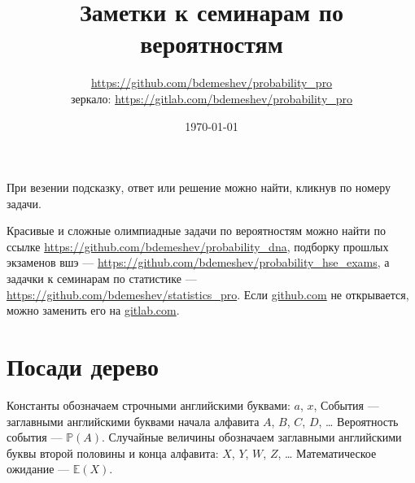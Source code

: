 \documentclass[12pt, a4paper]{article}
\title{Заметки к семинарам по вероятностям}
\author{\url{https://github.com/bdemeshev/probability_pro} \\
зеркало: \url{https://gitlab.com/bdemeshev/probability_pro}}
\date{\today}
\renewcommand{\P}{\mathbb{P}}
\newcommand{\E}{\mathbb{E}}
\begin{document}
\maketitle %


\newpage
\tableofcontents{}

\newpage

При везении подсказку, ответ или решение можно найти, кликнув по номеру задачи. 

Красивые и сложные олимпиадные задачи по вероятностям можно найти по ссылке \url{https://github.com/bdemeshev/probability_dna},
подборку прошлых экзаменов вшэ — \url{https://github.com/bdemeshev/probability_hse_exams},
а задачки к семинарам по статистике — \url{https://github.com/bdemeshev/statistics_pro}.
Если \url{github.com} не открывается, можно заменить его на \url{gitlab.com}.


\section{Посади дерево}

\begin{leftbar}
Константы обозначаем строчными английскими буквами: $a$, $x$, События ­— заглавными английскими буквами начала алфавита $A$, $B$, $C$, $D$, \ldots{ } Вероятность события — $\P(A)$.
Случайные величины обозначаем заглавными английскими буквы второй половины и конца алфавита: $X$, $Y$, $W$, $Z$, \ldots{ } Математическое ожидание — $\E(X)$.
\end{leftbar}
\end{document}
